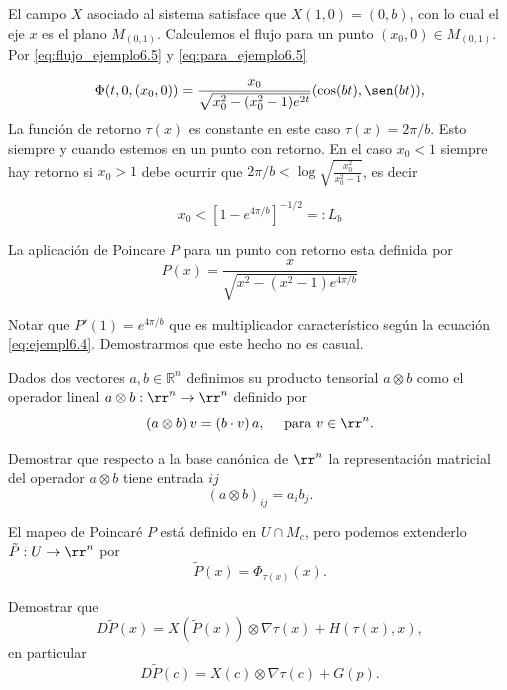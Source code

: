 \begin{ejemplo}
El campo $X$ asociado al sistema satisface que $X(1,0)=(0,b)$, con lo cual el eje $x$ es el plano $M_{(0,1)}$.  Calculemos el flujo para un punto $(x_0,0)\in M_{(0,1)}$. Por 
\eqref{eq:flujo_ejemplo6.5} y \eqref{eq:para_ejemplo6.5}

\[
  \Phi(t,0,(x_0,0))=\frac{x_0}{\sqrt{x_0^2-(x_0^2-1)e^{2t}}}(\cos(bt),\sen(bt)),
\]
La función de retorno $\tau(x)$ es constante en este caso $\tau(x)=2\pi/b$. Esto siempre y cuando estemos en un punto con retorno.  En el caso $x_0<1$ siempre hay retorno si $x_0>1$ debe ocurrir que $2\pi/b<\log\sqrt{\frac{x_0^2}{x_0^2-1}}$, es decir

\[x_0<[1-e^{4\pi/b}]^{-1/2}=: L_b\]

La aplicación de Poincare $P$ para un punto con retorno esta definida por
\[
  P(x)=\frac{x}{\sqrt{x^2-(x^2-1)e^{4\pi/b}}}
\]
\end{ejemplo}

Notar que $P'(1)=e^{4\pi/b}$ que es  multiplicador característico según la ecuación \eqref{eq:ejempl6.4}. Demostrarmos que este hecho no es casual.

\begin{definicion}
 Dados dos vectores $a,b\in\mathbb{R}^n$ definimos su producto tensorial $a\otimes b$ como el operador lineal  $a\otimes b:\rr^n\to\rr^n$ definido por
\[\left(a\otimes b\right)v=\left(b\cdot v\right)a,\quad \text{ para } v\in\rr^n.\]
\end{definicion}


\begin{ejercicio}
  Demostrar que respecto a la base canónica de  $\rr^n$ la representación matricial del operador $a\otimes b$ tiene entrada $ij$
\[\left(a\otimes b\right)_{ij}=a_ib_j.\]
\end{ejercicio}


El mapeo de Poincaré $P$ está definido en $U\cap M_c$, pero podemos extenderlo $\tilde{P}:U\to\rr^n$ por
\[\tilde{P}(x)=\Phi_{\tau(x)}(x).\]





\begin{ejercicio} Demostrar que
\[D\tilde{P}(x)=X(\tilde{P}(x))\otimes\nabla\tau(x)+H(\tau(x),x),\]
en particular
\[D\tilde{P}(c)=X(c)\otimes\nabla\tau(c)+G(p).\]
\end{ejercicio}


